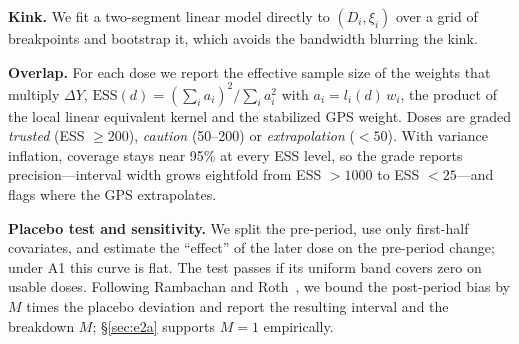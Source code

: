 \documentclass[sigconf,anonymous,review]{acmart}
\begin{document}
\begin{figure}[t]
\small
{}
\end{figure}

\textbf{Kink.} We fit a two-segment linear model directly to $(D_i,\xi_i)$ over a grid of breakpoints and bootstrap it, which avoids the bandwidth blurring the kink.

\textbf{Overlap.} For each dose we report the effective sample size of the weights that multiply $\Delta Y$, $\mathrm{ESS}(d)=(\sum_i a_i)^2/\sum_i a_i^2$ with $a_i=l_i(d)\,w_i$, the product of the local linear equivalent kernel and the stabilized GPS weight. Doses are graded \emph{trusted} (ESS $\ge 200$), \emph{caution} (50--200) or \emph{extrapolation} ($<50$). With variance inflation, coverage stays near 95\% at every ESS level, so the grade reports precision---interval width grows eightfold from ESS $>1000$ to ESS $<25$---and flags where the GPS extrapolates.

\textbf{Placebo test and sensitivity.}\label{sec:placebo} We split the pre-period, use only first-half covariates, and estimate the ``effect'' of the later dose on the pre-period change; under A1 this curve is flat. The test passes if its uniform band covers zero on usable doses. Following Rambachan and Roth~\cite{rambachan2023more}, we bound the post-period bias by $M$ times the placebo deviation and report the resulting interval and the breakdown $M$; \S\ref{sec:e2a} supports $M=1$ empirically.
\end{document}
